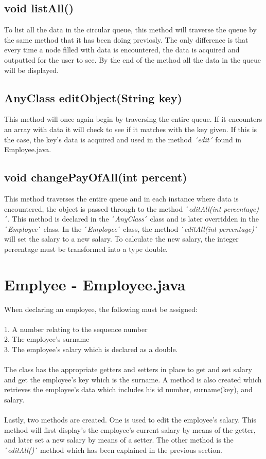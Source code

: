 \documentclass[12pt]{article}
\begin{document}
\subsection{void listAll()}
To list all the data in the circular queue, this method will traverse the queue by the same method that it has been doing previosly. The only difference is that every time a node filled with data is encountered, the data is acquired and outputted for the user to see. By the end of the method all the data in the queue will be displayed.\\


\subsection{AnyClass editObject(String key)}
This method will once again begin by traversing the entire queue. If it encounters an array with data it will check to see if it matches with the key given. If this is the case, the key's data is acquired and used in the method \emph{´edit´} found in Employee.java. 

\subsection{void changePayOfAll(int percent)}
This method traverses the entire queue and in each instance where data is encountered, the object is passed through to the method ´\emph{editAll(int percentage)}´. This method is declared in the ´\emph{AnyClass}´ class and is later overridden in the ´\emph{Employee}´ class. In the ´\emph{Employee}´ class, the method ´\emph{editAll(int percentage)}´ will set the salary to a new salary. To calculate the new salary, the integer percentage must be transformed into a type double.
\bigskip

\newpage
\section{Emplyee - Employee.java}

When declaring an employee, the following must be assigned:
\\
\\1. A number relating to the sequence number
\\2. The employee's surname
\\3. The employee's salary which is declared as a double.\\
\\The class has the appropriate getters and setters in place to get and set salary and get the employee's key which is the surname. A method is also created which retrieves the employee's data which includes his id number, surname(key), and salary.\\
\\Lastly, two methods are created. One is used to edit the employee's salary. This method will first display's the employee's current salary by means of the getter, and later set a new salary by means of a setter. The other method is the ´\emph{editAll()}´ method which has been explained in the previous section.
\bigskip 
\end{document}

